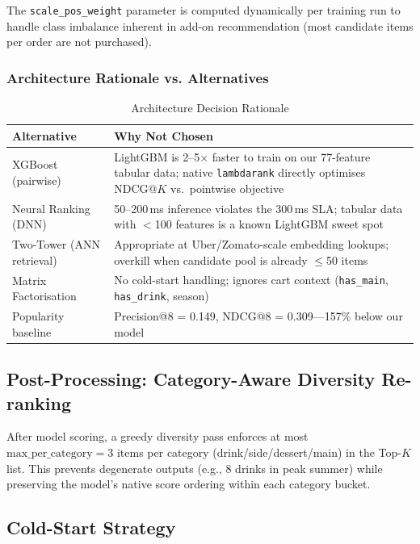 \documentclass[conference]{IEEEtran}
\begin{document}
The \texttt{scale\_pos\_weight} parameter is computed dynamically per training
run to handle class imbalance inherent in add-on recommendation (most candidate
items per order are not purchased).

\subsubsection{Architecture Rationale vs. Alternatives}

\begin{table}[h]
\caption{Architecture Decision Rationale}
\centering
\begin{tabular}{p{1.8cm}p{5.5cm}}
\toprule
Alternative & Why Not Chosen \\
\midrule
XGBoost (pairwise) & LightGBM is 2--5$\times$ faster to train on our
  77-feature tabular data; native \texttt{lambdarank} directly optimises
  NDCG@$K$ vs.\ pointwise objective \\
\addlinespace
Neural Ranking (DNN) & 50--200\,ms inference violates the 300\,ms SLA;
  tabular data with $<$100 features is a known LightGBM sweet spot
  \cite{grinsztajn2022tree} \\
\addlinespace
Two-Tower (ANN retrieval) & Appropriate at Uber/Zomato-scale embedding
  lookups; overkill when candidate pool is already $\leq$50 items \\
\addlinespace
Matrix Factorisation & No cold-start handling; ignores cart context
  (\texttt{has\_main}, \texttt{has\_drink}, season) \\
\addlinespace
Popularity baseline & Precision@8 = 0.149, NDCG@8 = 0.309---157\%
  below our model \\
\bottomrule
\end{tabular}
\end{table}

\subsection{Post-Processing: Category-Aware Diversity Re-ranking}

After model scoring, a greedy diversity pass enforces at most
$\text{max\_per\_category} = 3$ items per category
(drink/side/dessert/main) in the Top-$K$ list. This prevents degenerate
outputs (e.g., 8 drinks in peak summer) while preserving the model's native
score ordering within each category bucket.

\subsection{Cold-Start Strategy}
\end{document}
